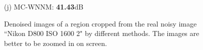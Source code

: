 \documentclass[10pt,onecolumn,letterpaper]{article}
\begin{document}
\begin{figure}[!htbp]
{\begin{minipage}[t]{0.25\textwidth}
{\footnotesize (j) MC-WNNM: \textbf{41.43}dB}
\end{minipage}
}
\caption{Denoised images of a region cropped from the real noisy image ``Nikon D800 ISO 1600 2" \cite{crosschannel2016} by different methods. The images are better to be zoomed in on screen.}
\label{f12}
\end{figure}


\begin{figure}[!htbp]
\centering
{}
\end{figure}
\end{document}
